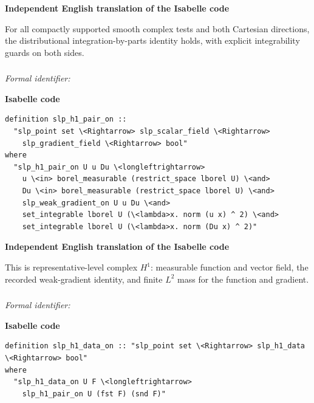 \documentclass[10pt,oneside]{article}
\newcommand{\reviewlabel}[1]{\par\smallskip\noindent\textsf{\bfseries #1}\par\smallskip}
\begin{document}
\reviewlabel{Independent English translation of the Isabelle code}
For all compactly supported smooth complex tests and both Cartesian directions, the distributional integration-by-parts identity holds, with explicit integrability guards on both sides.

\subsubsection{\texttt{}}
\noindent\textit{Formal identifier:} \texttt{}

\reviewlabel{Isabelle code}
\begin{lstlisting}
definition slp_h1_pair_on ::
  "slp_point set \<Rightarrow> slp_scalar_field \<Rightarrow>
    slp_gradient_field \<Rightarrow> bool"
where
  "slp_h1_pair_on U u Du \<longleftrightarrow>
    u \<in> borel_measurable (restrict_space lborel U) \<and>
    Du \<in> borel_measurable (restrict_space lborel U) \<and>
    slp_weak_gradient_on U u Du \<and>
    set_integrable lborel U (\<lambda>x. norm (u x) ^ 2) \<and>
    set_integrable lborel U (\<lambda>x. norm (Du x) ^ 2)"
\end{lstlisting}

\reviewlabel{Independent English translation of the Isabelle code}
This is representative-level complex $H^1$: measurable function and vector field, the recorded weak-gradient identity, and finite $L^2$ mass for the function and gradient.

\subsubsection{\texttt{}}
\noindent\textit{Formal identifier:} \texttt{}

\reviewlabel{Isabelle code}
\begin{lstlisting}
definition slp_h1_data_on :: "slp_point set \<Rightarrow> slp_h1_data \<Rightarrow> bool"
where
  "slp_h1_data_on U F \<longleftrightarrow>
    slp_h1_pair_on U (fst F) (snd F)"
\end{lstlisting}
\end{document}
